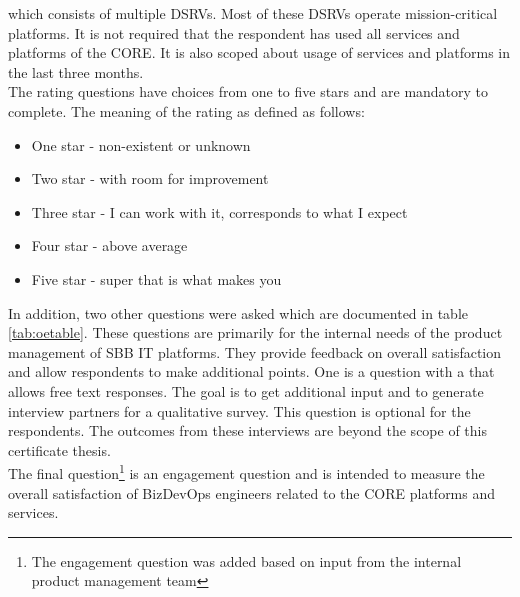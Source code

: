 \documentclass[a4paper,10pt]{article}
\begin{document}
    which consists of multiple DSRVs.
    Most of these DSRVs operate mission-critical platforms.
    It is not required that the respondent has used all services and platforms of the CORE.
    It is also scoped about usage of services and platforms in the last three months.\\
    The rating questions have choices from one to five stars and are mandatory to complete.
    The meaning of the rating as defined as follows:
    \begin{itemize}
        \item One star - non-existent or unknown
        \item Two star - with room for improvement
        \item Three star - I can work with it, corresponds to what I expect
        \item Four star - above average
        \item Five star - super that is what makes you
    \end{itemize}

    In addition, two other questions were asked which are documented in table \ref{tab:oetable}.
    These questions are primarily for the internal needs of the product management of SBB IT platforms.
    They provide feedback on overall satisfaction and allow respondents to make additional points.
    One is a question with a that allows free text responses.
    The goal is to get additional input and to generate interview partners for a qualitative survey.
    This question is optional for the respondents.
    The outcomes from these interviews are beyond the scope of this certificate thesis.\\
    The final question\footnote{The engagement question was added based on input from the internal product management team}
    is an engagement question and is intended to measure the overall satisfaction of BizDevOps engineers related to the CORE platforms and services.
\end{document}
